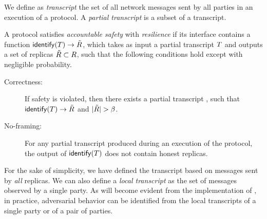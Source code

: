 \begin{definition}    
    We define as \emph{transcript} the set of all network messages sent by all parties in an execution of a protocol.
    A \emph{partial transcript} is a subset of a transcript.
\end{definition}

\begin{definition}\label{def:accountable-safety}
    A protocol satisfies \emph{accountable safety} with \emph{resilience} \beta if its interface contains a function $\mathsf{identify}(T) \rightarrow \tilde{R}$,
    which takes as input a partial transcript $T$ and outputs a set of replicas $\tilde{R} \subset R$, such that the 
    following conditions hold except with negligible probability.
    \begin{description}
        \item[Correctness:] If safety is violated, then there exists a partial transcript \tran, such that $\mathsf{identify}(T) \rightarrow \tilde{R}$ and $|\cheaters| > \beta$.
        \item[No-framing:] For any partial transcript \tran produced during an execution of the protocol, the output of $\mathsf{identify}(T)$ does not contain honest replicas.
    \end{description}
\end{definition}

\begin{remark}
    For the sake of simplicity, we have defined the transcript based on messages sent by \emph{all} replicas.
    We can also define a \emph{local transcript} as the set of messages observed by a single party.
    As will become evident from the implementation of \identify{}, in practice, adversarial behavior can be identified from the local transcripts of a single party or  of a pair of parties.
\end{remark}